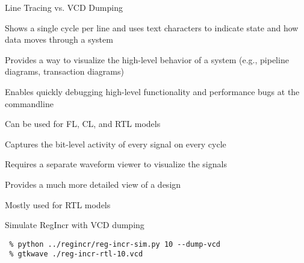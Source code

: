 \begin{frame}{Line Tracing vs. VCD Dumping}

\begin{cbxlist}

  \1 

    \2 Shows a single cycle per line and uses text characters to indicate
       state and how data moves through a system

    \vspace{0.08in}
    \2 Provides a way to visualize the high-level behavior of a system
       (e.g., pipeline diagrams, transaction diagrams)

    \vspace{0.08in}
    \2 Enables quickly debugging high-level functionality and performance
       bugs at the commandline

    \vspace{0.08in}
    \2 Can be used for FL, CL, and RTL models

  \1 

    \2 Captures the bit-level activity of every signal on every cycle

    \2 Requires a separate waveform viewer to visualize the signals

    \2 Provides a much more detailed view of a design

    \2 Mostly used for RTL models

\end{cbxlist}
\end{frame}

\begin{task}\begin{frame}[fragile]{Simulate RegIncr with VCD dumping}

\vspace{-0.15in}
\begin{Verbatim}[commandchars=\\\{\}]
 % cd \midtilde/pymtl-tut/build
 % python ../regincr/reg-incr-sim.py 10 --dump-vcd
 % gtkwave ./reg-incr-rtl-10.vcd
\end{Verbatim}

  \smallskip

\end{frame}
\end{task}

